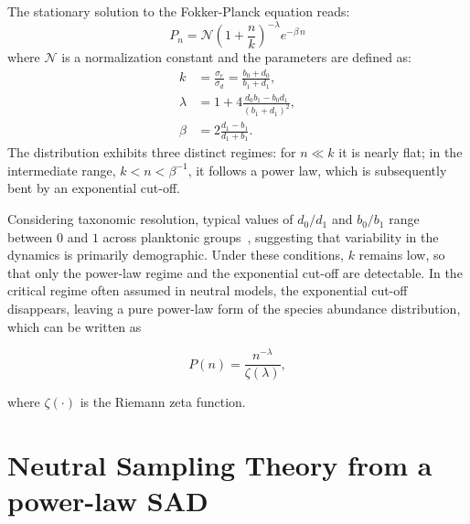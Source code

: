 \documentclass[%
 preprint,            %
 superscriptaddress, %
 amsmath,amssymb,    %
 aps,                %
 pra,                %
 floatfix,           %
]{revtex4-2}
\begin{document}
The stationary solution to the Fokker-Planck equation reads:
\begin{equation}
    P_n= \mathcal{N} \left(1+\frac{n}{k}\right)^{-\lambda} e^{-\beta\, n}
    \label{eq:SAD-mG}
\end{equation}
where $\mathcal{N}$ is a normalization constant and the parameters are defined as:
\begin{equation}
    \begin{aligned}
        k&=\frac{\sigma_e}{\sigma_d }=\frac{b_0+d_0}{b_1+d_1},\\
        \lambda &= 1 + 4 \frac{d_0 b_1 - b_0 d_1}{(b_1+d_1)^2}, \\
        \beta &= 2 \frac{d_1-b_1}{d_1+b_1}.
    \end{aligned}
    \label{eq:params-mG}
\end{equation}
The distribution exhibits three distinct regimes: for $n \ll k$ it is nearly flat; in the intermediate range, $k < n < \beta^{-1}$, it follows a power law, which is subsequently bent by an exponential cut-off.

Considering taxonomic resolution, typical values of $d_0/d_1$ and $b_0/b_1$ range between $0$ and $1$ across planktonic groups~\cite{sergiacomi2018ubiquitous}, suggesting that variability in the dynamics is primarily demographic. Under these conditions, $k$ remains low, so that only the power-law regime and the exponential cut-off are detectable. In the critical regime often assumed in neutral models, the exponential cut-off disappears, leaving a pure power-law form of the species abundance distribution, which can be written as

\begin{equation}
P(n) = \frac{n^{-\lambda}}{\zeta(\lambda)} ,
\end{equation}

where $\zeta(\cdot)$ is the Riemann zeta function.

\section{Neutral Sampling Theory from a power-law SAD}
\end{document}
